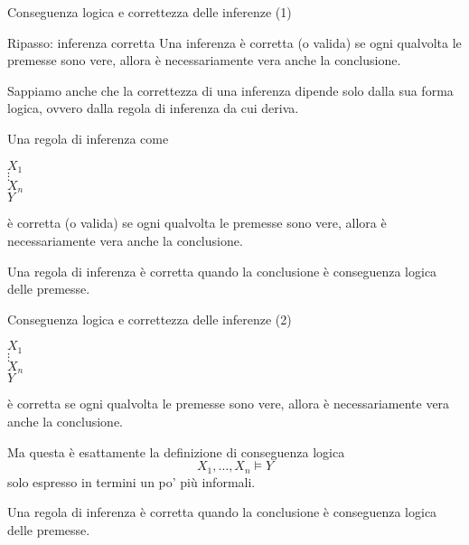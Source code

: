 \documentclass[aspectratio=169,10pt,dvipsnames,xcolor=table,handout]{beamer}
\begin{document}
\begin{frame}{Conseguenza logica e correttezza delle inferenze (1)}
    \begin{block}{Ripasso: inferenza corretta}
		Una inferenza è \alert{corretta} (o \alert{valida}) se ogni qualvolta le premesse sono vere, allora è necessariamente vera anche la conclusione.
    \end{block}

    \pause Sappiamo anche che la correttezza di una inferenza dipende solo dalla sua forma logica, ovvero dalla regola di inferenza da cui deriva.

    \pause
    \begin{definition}
        Una regola di inferenza come
        \begin{center}
            \begin{inference}
                $X_1$\\
                $\vdots$\\
                $X_n$\\
                \hline
                $Y$
            \end{inference}
        \end{center}
        è \alert{corretta} (o \alert{valida}) se ogni qualvolta le premesse sono vere, allora è necessariamente vera anche la conclusione.
    \end{definition}

    \pause
    \begin{theorem}
        Una regola di inferenza è corretta quando la conclusione è conseguenza logica delle premesse.
    \end{theorem}
\end{frame}

\begin{frame}{Conseguenza logica e correttezza delle inferenze (2)}
    \begin{definition}
        \begin{center}
            \begin{inference}
                $X_1$\\
                $\vdots$\\
                $X_n$\\
                \hline
                $Y$
            \end{inference}
        \end{center}
        è \alert{corretta} se ogni qualvolta le premesse sono vere, allora è necessariamente vera anche la conclusione.
    \end{definition}
    \pause
    Ma questa è esattamente la definizione di conseguenza logica
    \[
    X_1, \ldots, X_n \models Y
    \]
    solo espresso in termini un po' più informali.

    \pause
    \begin{theorem}
        Una regola di inferenza è corretta quando la conclusione è conseguenza logica delle premesse.
    \end{theorem}
\end{frame}
\end{document}
